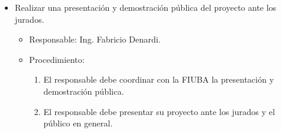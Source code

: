 \documentclass[
11pt, %
]{charter}
\begin{document}
\begin{itemize}
\begin{itemize}
	 \end{itemize}
	 
	 \item Realizar una presentación y demostración pública del proyecto ante los jurados. 
	  \begin{itemize}
	 \item Responsable: Ing. Fabricio Denardi.
	 \item Procedimiento:
	 \begin{enumerate}
	 \item El responsable debe coordinar con la FIUBA la presentación y demostración pública.
	 	\item El responsable debe presentar su proyecto ante los jurados y el público en general.
	 \end{enumerate}
	 \end{itemize}
\end{itemize}
\end{document}
